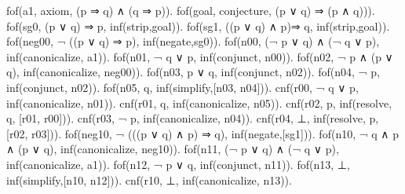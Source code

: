 fof(a1, axiom, (p ⇒ q) ∧ (q ⇒ p)).
fof(goal, conjecture, (p ∨ q) ⇒ (p ∧ q))).
fof(sg0, (p ∨ q) ⇒ p, inf(strip,goal)).
fof(sg1, ((p ∨ q) ∧ p)⇒ q, inf(strip,goal)).
fof(neg00, ¬ ((p ∨ q) ⇒ p), inf(negate,sg0)).
fof(n00, (¬ p ∨ q) ∧ (¬ q ∨ p), inf(canonicalize, a1)).
fof(n01, ¬ q ∨ p, inf(conjunct, n00)).
fof(n02, ¬ p ∧ (p ∨ q), inf(canonicalize, neg00)).
fof(n03, p ∨ q, inf(conjunct, n02)).
fof(n04, ¬ p, inf(conjunct, n02)).
fof(n05, q, inf(simplify,[n03, n04])).
cnf(r00, ¬ q ∨ p, inf(canonicalize, n01)).
cnf(r01, q, inf(canonicalize, n05)).
cnf(r02, p, inf(resolve, q, [r01, r00])).
cnf(r03, ¬ p, inf(canonicalize, n04)).
cnf(r04, ⊥, inf(resolve, p, [r02, r03])).
fof(neg10, ¬ (((p ∨ q) ∧ p) ⇒ q), inf(negate,[sg1])).
fof(n10, ¬ q ∧ p ∧ (p ∨ q), inf(canonicalize, neg10)).
fof(n11, (¬ p ∨ q) ∧ (¬ q ∨ p), inf(canonicalize, a1)).
fof(n12, ¬ p ∨ q, inf(conjunct, n11)).
fof(n13, ⊥, inf(simplify,[n10, n12])).
cnf(r10, ⊥, inf(canonicalize, n13)).
